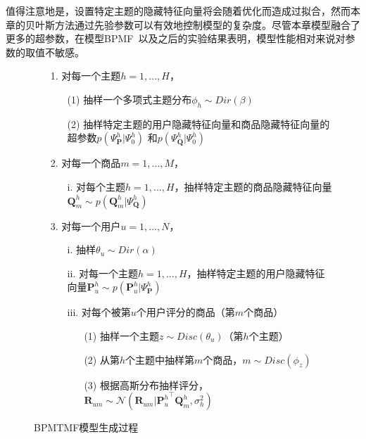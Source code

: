值得注意地是，设置特定主题的隐藏特征向量将会随着优化而造成过拟合，然而本章的贝叶斯方法通过先验参数可以有效地控制模型的复杂度。尽管本章模型融合了更多的超参数，在模型BPMF~\cite{salakhutdinov2008bayesian}以及之后的实验结果表明，模型性能相对来说对参数的取值不敏感。


\begin{figure}
	\centering
		\begin{itemize}
			\item[1.] 对每一个主题$h=1,...,H$，
			\begin{itemize}
				\item[(1)] 抽样一个多项式主题分布$\phi_h \sim Dir(\beta)$
				\item[(2)] 抽样特定主题的用户隐藏特征向量和商品隐藏特征向量的超参数$p(\Psi_{\mathbf{P}}^{h}|\Psi_0^{h})$ 和$p(\Psi_{\mathbf{Q}}^{h}|\Psi_0^{h})$
			\end{itemize}
			\item[2.] 对每一个商品$m=1,...,M$，
			\begin{itemize}
				\item[i.] 对每个主题$h=1,...,H$，抽样特定主题的商品隐藏特征向量${\mathbf{Q}_{m}^{h}} \sim p(\mathbf{Q}_{m}^{h}|\Psi_{\mathbf{Q}}^{h})$	 	
			\end{itemize}
			\item[3.] 对每一个用户$u=1,...,N$，
			\begin{itemize}
				\item[i.] 抽样$\theta_u \sim Dir(\alpha)$
				\item[ii.] 对每一个主题$h=1,...,H$，抽样特定主题的用户隐藏特征向量${\mathbf{P}_{u}^{h}} \sim p(\mathbf{P}_{u}^{h}|\Psi_{\mathbf{P}}^{h})$
				\item[iii.] 对每个被第$u$个用户评分的商品（第$m$个商品）
				\begin{itemize}
					\item[(1)] 抽样一个主题$z\sim Disc(\theta_u)$（第$h$个主题）
					\item[(2)] 从第$h$个主题中抽样第$m$个商品，$m\sim Disc(\phi_{z})$
					\item[(3)] 根据高斯分布抽样评分，$\mathbf{R}_{um}\sim \mathcal{N}(\mathbf{R}_{um}|{\mathbf{P}_{u}^{h}}^\top \mathbf{Q}_{m}^{h},\sigma_h^2)$
				\end{itemize}
			\end{itemize}
		\end{itemize}
	\caption{BPMTMF模型生成过程}
	\label{fig-bpmtmf-generativeprocess}
\end{figure}


